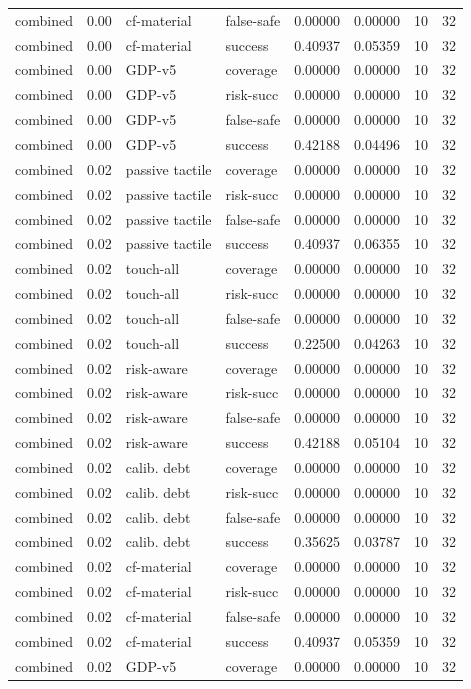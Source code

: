 \documentclass{article}
\begin{document}
\begin{center}
\begin{longtable}{llllllll}
combined & 0.00 & cf-material & false-safe & 0.00000 & 0.00000 & 10 & 32 \\
combined & 0.00 & cf-material & success & 0.40937 & 0.05359 & 10 & 32 \\
combined & 0.00 & GDP-v5 & coverage & 0.00000 & 0.00000 & 10 & 32 \\
combined & 0.00 & GDP-v5 & risk-succ & 0.00000 & 0.00000 & 10 & 32 \\
combined & 0.00 & GDP-v5 & false-safe & 0.00000 & 0.00000 & 10 & 32 \\
combined & 0.00 & GDP-v5 & success & 0.42188 & 0.04496 & 10 & 32 \\
combined & 0.02 & passive tactile & coverage & 0.00000 & 0.00000 & 10 & 32 \\
combined & 0.02 & passive tactile & risk-succ & 0.00000 & 0.00000 & 10 & 32 \\
combined & 0.02 & passive tactile & false-safe & 0.00000 & 0.00000 & 10 & 32 \\
combined & 0.02 & passive tactile & success & 0.40937 & 0.06355 & 10 & 32 \\
combined & 0.02 & touch-all & coverage & 0.00000 & 0.00000 & 10 & 32 \\
combined & 0.02 & touch-all & risk-succ & 0.00000 & 0.00000 & 10 & 32 \\
combined & 0.02 & touch-all & false-safe & 0.00000 & 0.00000 & 10 & 32 \\
combined & 0.02 & touch-all & success & 0.22500 & 0.04263 & 10 & 32 \\
combined & 0.02 & risk-aware & coverage & 0.00000 & 0.00000 & 10 & 32 \\
combined & 0.02 & risk-aware & risk-succ & 0.00000 & 0.00000 & 10 & 32 \\
combined & 0.02 & risk-aware & false-safe & 0.00000 & 0.00000 & 10 & 32 \\
combined & 0.02 & risk-aware & success & 0.42188 & 0.05104 & 10 & 32 \\
combined & 0.02 & calib. debt & coverage & 0.00000 & 0.00000 & 10 & 32 \\
combined & 0.02 & calib. debt & risk-succ & 0.00000 & 0.00000 & 10 & 32 \\
combined & 0.02 & calib. debt & false-safe & 0.00000 & 0.00000 & 10 & 32 \\
combined & 0.02 & calib. debt & success & 0.35625 & 0.03787 & 10 & 32 \\
combined & 0.02 & cf-material & coverage & 0.00000 & 0.00000 & 10 & 32 \\
combined & 0.02 & cf-material & risk-succ & 0.00000 & 0.00000 & 10 & 32 \\
combined & 0.02 & cf-material & false-safe & 0.00000 & 0.00000 & 10 & 32 \\
combined & 0.02 & cf-material & success & 0.40937 & 0.05359 & 10 & 32 \\
combined & 0.02 & GDP-v5 & coverage & 0.00000 & 0.00000 & 10 & 32 \\
\bottomrule
\end{longtable}
\renewcommand{\arraystretch}{1.0}
\end{center}
\end{document}
